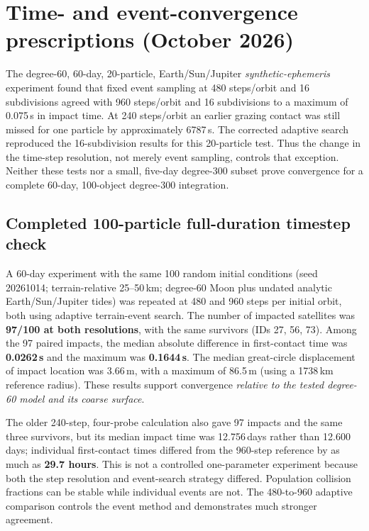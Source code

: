 \documentclass[11pt,a4paper]{article}
\begin{document}
\section{Time- and event-convergence prescriptions (October 2026)}
\begin{warningbox}[title={Evidence is limited; not a universal convergence certificate}]
The degree-60, 60-day, 20-particle, Earth/Sun/Jupiter \emph{synthetic-ephemeris}
experiment found that fixed event sampling at 480 steps/orbit and 16 subdivisions
agreed with 960 steps/orbit and 16 subdivisions to a maximum of 0.075\,s
in impact time. At 240 steps/orbit an earlier grazing contact was still missed
for one particle by approximately 6787\,s. The corrected adaptive search
reproduced the 16-subdivision results for this 20-particle test. Thus the
change in the time-step resolution, not merely event sampling, controls that
exception. Neither these tests nor a small, five-day degree-300 subset prove
convergence for a complete 60-day, 100-object degree-300 integration.
\end{warningbox}

\subsection{Completed 100-particle full-duration timestep check}
A 60-day experiment with the same 100 random initial conditions
(seed 20261014; terrain-relative 25--50\,km; degree-60 Moon plus undated
analytic Earth/Sun/Jupiter tides) was repeated at 480 and 960 steps
per initial orbit, both using adaptive terrain-event search. The number
of impacted satellites was \textbf{97/100 at both resolutions}, with the
same survivors (IDs 27, 56, 73). Among the 97 paired impacts, the
median absolute difference in first-contact time was \textbf{0.0262\,s}
and the maximum was \textbf{0.1644\,s}. The median great-circle
displacement of impact location was 3.66\,m, with a maximum of 86.5\,m
(using a 1738\,km reference radius). These results support convergence
\emph{relative to the tested degree-60 model and its coarse surface}.

The older 240-step, four-probe calculation also gave 97 impacts and the
same three survivors, but its median impact time was 12.756\,days rather
than 12.600\,days; individual first-contact times differed from the
960-step reference by as much as \textbf{29.7 hours}. This is not a
controlled one-parameter experiment because both the step resolution and
event-search strategy differed. Population collision fractions can be
stable while individual events are not. The 480-to-960 adaptive comparison
controls the event method and demonstrates much stronger agreement.
\end{document}
